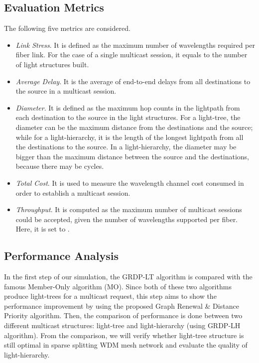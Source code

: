 \documentclass[conference]{IEEEtran}
\begin{document}
\subsection{Evaluation Metrics}
\label{subsec: Evaluation Metrics}
The following five metrics are considered.
\begin{itemize}
  \item \emph{Link Stress}. It is defined as the maximum number of wavelengths required per fiber link. For the case of a single multicast session, it equals to the number of light structures built.


  \item \emph{Average Delay}.  It is the average of end-to-end delays from all destinations to the source in a multicast session.



  \item \emph{Diameter}. It is defined as the maximum hop counts in the lightpath from each destination to the source in the light structures. For a light-tree, the diameter can be the maximum distance from the destinations and the source; while for a light-hierarchy, it is the length of the longest lightpath from all the destinations to the source. In a light-hierarchy, the diameter may be bigger than the maximum distance between the source and the destinations, because there may be cycles.



  \item \emph{Total Cost}. It is used to measure the wavelength channel cost consumed in order to establish a multicast session.



  \item \emph{Throughput}. It is computed as the maximum number of multicast sessions could be accepted, given the number of wavelengths supported per fiber. Here, it is set to .
\end{itemize}

\subsection{Performance Analysis}
\label{subsec: Performance Analysis}
In the first step of our simulation, the GRDP-LT algorithm is compared with the famous Member-Only algorithm (MO). Since both of these two algorithms produce light-trees for a multicast request, this step aims to show the performance improvement by using the proposed Graph Renewal \& Distance Priority algorithm. Then, the comparison of performance is done between two different multicast structures: light-tree and light-hierarchy (using GRDP-LH algorithm). From the comparison, we will verify whether light-tree structure is still optimal in sparse splitting WDM mesh network and evaluate the quality of light-hierarchy.
\end{document}
